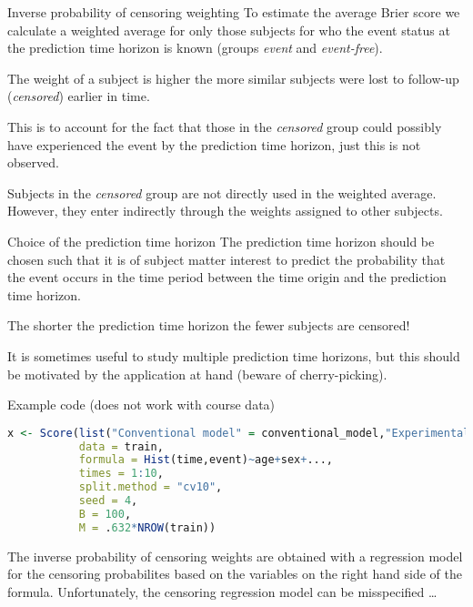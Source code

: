 \documentclass{beamer}\usepackage{listings}
\begin{document}
\begin{frame}[label={sec:orgb4879aa}]{Inverse probability of censoring weighting}
To estimate the average Brier score we calculate a weighted average
for only those subjects for who the event status
at the prediction time horizon is known (groups \emph{event} and
\emph{event-free}).

\vfill The weight of a subject is higher the more similar subjects
were lost to follow-up (\emph{censored}) earlier in time.

\vfill This is to account for the fact that those in the \emph{censored}
group could possibly have experienced the event by the prediction time
horizon, just this is not observed.

\vfill
Subjects in the \emph{censored} group are not directly used in
the weighted average. However, they enter indirectly through the
weights assigned to other subjects.  
\end{frame}
\begin{frame}[label={sec:org8f3b798}]{Choice of the prediction time horizon}
The prediction time horizon should be chosen such that it is of
subject matter interest to predict the probability that the event
occurs in the time period between the time origin and the prediction
time horizon.
\vfill

The shorter the prediction time horizon the fewer subjects are
censored!
\vfill

It is sometimes useful to study multiple
prediction time horizons, but this should be motivated by the
application at hand (beware of cherry-picking).
\end{frame}
\begin{frame}[label={sec:org6383628},fragile]{Example code (does not work with course data)}
 \begin{lstlisting}[language=r,numbers=none,otherkeywords={formula,times,event,Hist}, deletekeywords={model,data,NROW,split,null}]
x <- Score(list("Conventional model" = conventional_model,"Experimental model" = experimental_model),
           data = train,
           formula = Hist(time,event)~age+sex+...,
           times = 1:10,
           split.method = "cv10",
           seed = 4,
           B = 100,
           M = .632*NROW(train))
\end{lstlisting}
\vfill\pause

The inverse probability of censoring weights are obtained with
a regression model for the censoring probabilites based on the
variables on the right hand side of the formula. Unfortunately,
the censoring regression model can be misspecified \dots{}
\end{frame}
\end{document}
